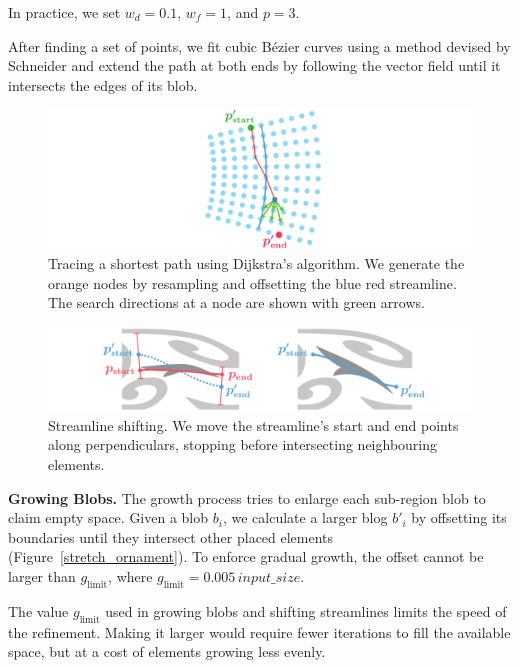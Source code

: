 In practice, we set $w_d = 0.1$, $w_f=1$, and $p = 3$.

After finding a set of points, we fit cubic B\'ezier curves using a method
devised by Schneider \cite{Schneider1990} and extend the path at both ends 
by following
the vector field until it intersects the edges of its blob. 

\begin{figure}
\includegraphics[width=1.0\textwidth]{figures/flowpak/dijkstra.pdf}
 \caption[Tracing a shortest path]
 {\label{dijkstra}
 Tracing a shortest path using Dijkstra's algorithm.  We generate the 
 orange nodes by resampling and offsetting the blue red streamline.
          The search directions at a node are shown with green arrows.}
\end{figure}

\begin{figure}
 \includegraphics[width=1.0\textwidth]{figures/flowpak/shift_streamline.pdf}
 \caption[Shifting a streamline]
 {\label{shift_streamline}
 Streamline shifting.
  We move the streamline's start and end points along 
  perpendiculars, stopping before intersecting neighbouring elements.}
\end{figure}

\textbf{Growing Blobs.} The growth process tries to enlarge each sub-region blob to
claim empty space.
Given a blob $b_{i}$, we calculate a larger blog $b'_{i}$ 
by offsetting its boundaries until they intersect other placed elements (Figure~\ref{stretch_ornament}).
To enforce gradual growth, the offset cannot be larger than $g_\mathrm{limit}$, where
$g_\mathrm{limit}=0.005\,input\_size$.

The value $g_\mathrm{limit}$ used in growing blobs and shifting streamlines limits the speed of
the refinement.  Making it larger would require fewer iterations to fill the available space,
but at a cost of elements growing less evenly. 

